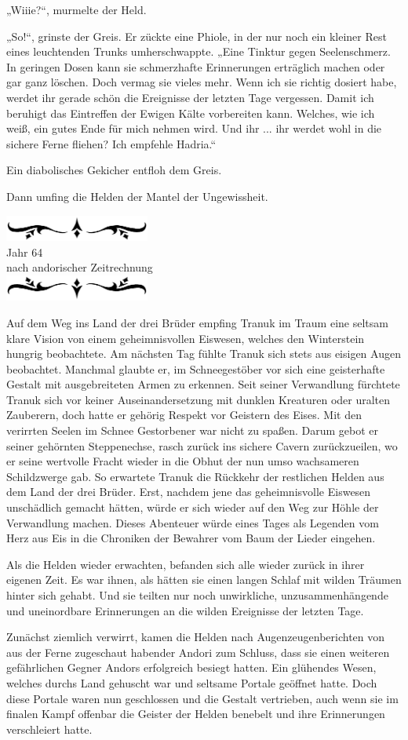 \documentclass[10pt, a4paper, oneside]{book}
\newcommand{\az}[1]{%
    \begin{center}
        \includegraphics[width=180px]{Das Erbe des Wunderkindes/verzierung1.png}\\
        {\Huge #1} \\
        {nach andorischer Zeitrechnung}\\
        \includegraphics[width=180px]{Das Erbe des Wunderkindes/verzierung2.png}
    \end{center}
    \extramarks{}{#1 a.Z.}
}
\begin{document}
„Wiiie?“, murmelte der Held.

„So!“, grinste der Greis. Er zückte eine Phiole, in der nur noch ein kleiner Rest eines leuchtenden Trunks umherschwappte. „Eine Tinktur gegen Seelenschmerz. In geringen Dosen kann sie schmerzhafte Erinnerungen erträglich machen oder gar ganz löschen. Doch vermag sie vieles mehr. Wenn ich sie richtig dosiert habe, werdet ihr gerade schön die Ereignisse der letzten Tage vergessen. Damit ich beruhigt das Eintreffen der Ewigen Kälte vorbereiten kann. Welches, wie ich weiß, ein gutes Ende für mich nehmen wird. Und ihr ... ihr werdet wohl in die sichere Ferne fliehen? Ich empfehle Hadria.“

Ein diabolisches Gekicher entfloh dem Greis.

Dann umfing die Helden der Mantel der Ungewissheit. \bigskip



\az{Jahr 64}

Auf dem Weg ins Land der drei Brüder empfing Tranuk im Traum eine seltsam klare Vision von einem geheimnisvollen Eiswesen, welches den Winterstein hungrig beobachtete. Am nächsten Tag fühlte Tranuk sich stets aus eisigen Augen beobachtet. Manchmal glaubte er, im Schneegestöber vor sich eine geisterhafte Gestalt mit ausgebreiteten Armen zu erkennen. Seit seiner Verwandlung fürchtete Tranuk sich vor keiner Auseinandersetzung mit dunklen Kreaturen oder uralten Zauberern, doch hatte er gehörig Respekt vor Geistern des Eises. Mit den verirrten Seelen im Schnee Gestorbener war nicht zu spaßen. Darum gebot er seiner gehörnten Steppenechse, rasch zurück ins sichere Cavern zurückzueilen, wo er seine wertvolle Fracht wieder in die Obhut der nun umso wachsameren Schildzwerge gab. So erwartete Tranuk die Rückkehr der restlichen Helden aus dem Land der drei Brüder. Erst, nachdem jene das geheimnisvolle Eiswesen unschädlich gemacht hätten, würde er sich wieder auf den Weg zur Höhle der Verwandlung machen. Dieses Abenteuer würde eines Tages als Legenden vom Herz aus Eis in die Chroniken der Bewahrer vom Baum der Lieder eingehen.\bigskip

Als die Helden wieder erwachten, befanden sich alle wieder zurück in ihrer eigenen Zeit. Es war ihnen, als hätten sie einen langen Schlaf mit wilden Träumen hinter sich gehabt. Und sie teilten nur noch unwirkliche, unzusammenhängende und uneinordbare Erinnerungen an die wilden Ereignisse der letzten Tage. 

Zunächst ziemlich verwirrt, kamen die Helden nach Augenzeugenberichten von aus der Ferne zugeschaut habender Andori zum Schluss, dass sie einen weiteren gefährlichen Gegner Andors erfolgreich besiegt hatten. Ein glühendes Wesen, welches durchs Land gehuscht war und seltsame Portale geöffnet hatte. Doch diese Portale waren nun geschlossen und die Gestalt vertrieben, auch wenn sie im finalen Kampf offenbar die Geister der Helden benebelt und ihre Erinnerungen verschleiert hatte. 
\end{document}
